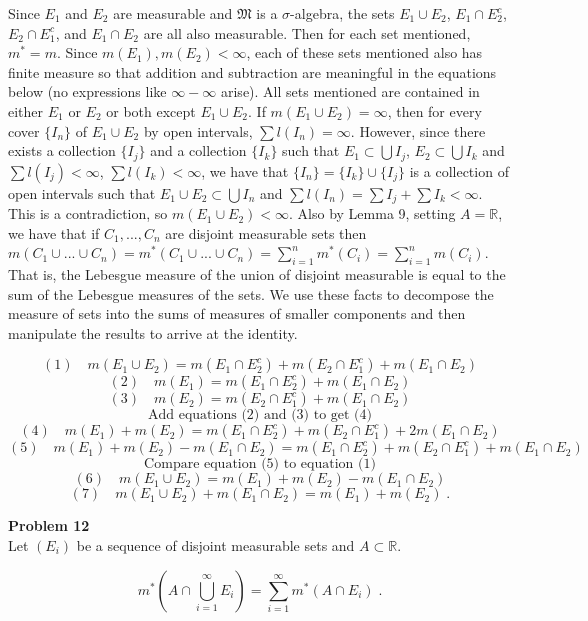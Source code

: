 \documentclass[a4paper]{article}
\begin{document}
Since $E_1$ and $E_2$ are measurable and $\mathfrak{M}$ is a $\sigma$-algebra, the sets $E_1\cup E_2$, $E_1 \cap E_2^c$, $E_2\cap E_1^c$, and  $E_1\cap E_2$ are all also measurable. Then for each set mentioned, $m^* = m$. Since $m(E_1),m(E_2) < \infty$, each of these sets mentioned also has finite measure so that addition and subtraction are meaningful in the equations below (no expressions like $\infty - \infty$ arise). All sets mentioned are contained in either $E_1$ or $E_2$ or both except $E_1 \cup E_2$. If $m(E_1 \cup E_2) = \infty$, then for every cover $\{I_n\}$ of $E_1\cup E_2$ by open intervals, $\sum l(I_n) = \infty$. However, since there exists a collection $\{I_j\}$ and a collection $\{I_k\}$ such that $E_1 \subset \bigcup I_j$, $E_2 \subset \bigcup I_k$ and $\sum l(I_j) < \infty$, $\sum l(I_k) < \infty$, we have that $\{I_n\} = \{I_k\} \cup \{I_j\}$ is a collection of open intervals such that $E_1\cup E_2 \subset \bigcup I_n$ and $\sum l(I_n) = \sum I_j + \sum I_k < \infty$. This is a contradiction, so $m(E_1 \cup E_2) < \infty$. Also by Lemma 9, setting $A = \mathbb{R}$, we have that if $C_1,...,C_n$ are disjoint measurable sets then $m(C_1\cup ... \cup C_n) = m^*(C_1 \cup ... \cup C_n) = \sum_{i=1}^n m^*(C_i) = \sum_{i=1}^n m(C_i)$. That is, the Lebesgue measure of the union of disjoint measurable is equal to the sum of the Lebesgue measures of the sets. We use these facts to decompose the measure of sets into the sums of measures of smaller components and then manipulate the results to arrive at the identity.

$$(1) \quad m(E_1\cup E_2) = m(E_1 \cap E_2^c) + m(E_2 \cap E_1^c) + m(E_1 \cap E_2)$$
$$(2) \quad m(E_1) = m(E_1\cap E_2^c) + m(E_1\cap E_2)$$
$$(3) \quad m(E_2) = m(E_2 \cap E_1^c) +m(E_1 \cap E_2)$$
$$\text{ Add equations (2) and (3) to get (4) }$$
$$(4) \quad m(E_1) + m(E_2) = m(E_1\cap E_2^c) + m(E_2 \cap E_1^c) + 2m(E_1\cap E_2)$$
$$(5) \quad m(E_1) + m(E_2) - m(E_1\cap E_2) = m(E_1\cap E_2^c) + m(E_2 \cap E_1^c) + m(E_1\cap E_2)$$
$$\text{ Compare equation (5) to equation (1) }$$
$$(6) \quad m(E_1 \cup E_2) = m(E_1) + m(E_2) - m(E_1\cap E_2)$$
$$(7) \quad m(E_1 \cup E_2) + m(E_1\cap E_2)= m(E_1) + m(E_2) \;.$$
 
{\bf Problem 12}\\

Let $(E_i)$ be a sequence of disjoint measurable sets and $A \subset \mathbb{R}$.

$$m^*\left(A \cap \bigcup_{i=1}^\infty E_i \right) = \sum_{i=1}^\infty m^*(A \cap E_i) \;.$$
\end{document}
